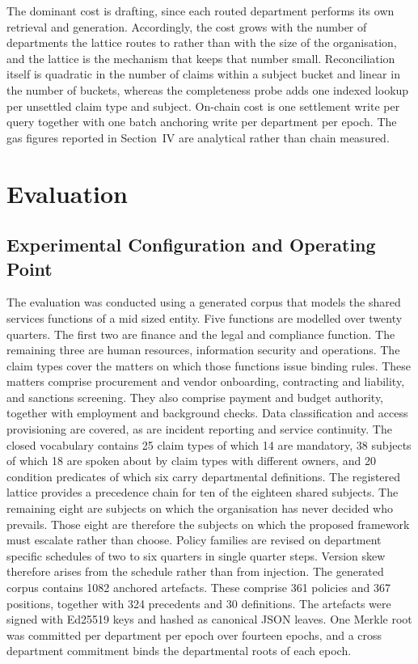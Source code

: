 \documentclass[journal]{IEEEtran}
\begin{document}
The dominant cost is drafting, since each routed department performs its own retrieval and generation. Accordingly, the cost grows with the number of departments the lattice routes to rather than with the size of the organisation, and the lattice is the mechanism that keeps that number small. Reconciliation itself is quadratic in the number of claims within a subject bucket and linear in the number of buckets, whereas the completeness probe adds one indexed lookup per unsettled claim type and subject. On-chain cost is one settlement write per query together with one batch anchoring write per department per epoch. The gas figures reported in Section~IV are analytical rather than chain measured.

\section{Evaluation}

\subsection{Experimental Configuration and Operating Point}

The evaluation was conducted using a generated corpus that models the shared services functions of a mid sized entity. Five functions are modelled over twenty quarters. The first two are finance and the legal and compliance function. The remaining three are human resources, information security and operations. The claim types cover the matters on which those functions issue binding rules. These matters comprise procurement and vendor onboarding, contracting and liability, and sanctions screening. They also comprise payment and budget authority, together with employment and background checks. Data classification and access provisioning are covered, as are incident reporting and service continuity. The closed vocabulary contains 25 claim types of which 14 are mandatory, 38 subjects of which 18 are spoken about by claim types with different owners, and 20 condition predicates of which six carry departmental definitions. The registered lattice provides a precedence chain for ten of the eighteen shared subjects. The remaining eight are subjects on which the organisation has never decided who prevails. Those eight are therefore the subjects on which the proposed framework must escalate rather than choose. Policy families are revised on department specific schedules of two to six quarters in single quarter steps. Version skew therefore arises from the schedule rather than from injection. The generated corpus contains 1082 anchored artefacts. These comprise 361 policies and 367 positions, together with 324 precedents and 30 definitions. The artefacts were signed with Ed25519 keys and hashed as canonical JSON leaves. One Merkle root was committed per department per epoch over fourteen epochs, and a cross department commitment binds the departmental roots of each epoch.
\end{document}
